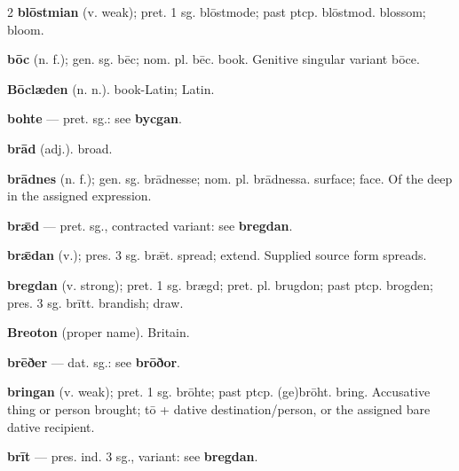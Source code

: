 \begin{multicols*}{2}
\textbf{blōstmian} (v. weak); pret. 1 sg. blōstmode; past ptcp. blōstmod. blossom; bloom.\par
\textbf{bōc} (n. f.); gen. sg. bēc; nom. pl. bēc. book. Genitive singular variant bōce.\par
\textbf{Bōclæden} (n. n.). book-Latin; Latin.\par
\textbf{bohte} — pret. sg.: see \textbf{bycgan}.\par
\textbf{brād} (adj.). broad.\par
\textbf{brādnes} (n. f.); gen. sg. brādnesse; nom. pl. brādnessa. surface; face. Of the deep in the assigned expression.\par
\textbf{brǣd} — pret. sg., contracted variant: see \textbf{bregdan}.\par
\textbf{brǣdan} (v.); pres. 3 sg. brǣt. spread; extend. Supplied source form spreads.\par
\textbf{bregdan} (v. strong); pret. 1 sg. brægd; pret. pl. brugdon; past ptcp. brogden; pres. 3 sg. brītt. brandish; draw.\par
\textbf{Breoton} (proper name). Britain.\par
\textbf{brēðer} — dat. sg.: see \textbf{brōðor}.\par
\textbf{bringan} (v. weak); pret. 1 sg. brōhte; past ptcp. (ge)brōht. bring. Accusative thing or person brought; tō + dative destination/person, or the assigned bare dative recipient.\par
\textbf{brīt} — pres. ind. 3 sg., variant: see \textbf{bregdan}.\par

\end{multicols*}
